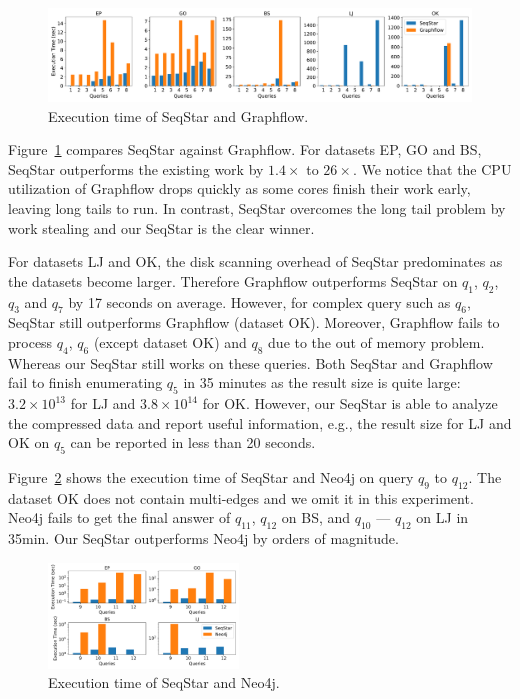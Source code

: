 \begin{figure}[ht]
  \centering
  \includegraphics[width=\textwidth]{img/exp_compare.pdf}
  \caption{Execution time of SeqStar and Graphflow.}\label{img:exp_compare}
\end{figure}

Figure~\ref{img:exp_compare} compares SeqStar against Graphflow.
For datasets EP, GO and BS, SeqStar outperforms the existing work by $1.4\times$ to $26\times$.
We notice that the CPU utilization of Graphflow drops quickly as some cores finish their work early,
leaving long tails to run.
In contrast, SeqStar overcomes the long tail problem by work stealing and our SeqStar is the clear winner.

For datasets LJ and OK, the disk scanning overhead of SeqStar predominates as the datasets become larger.
Therefore Graphflow outperforms SeqStar on $q_1$, $q_2$, $q_3$ and $q_7$ by 17 seconds on average.
However, for complex query such as $q_6$, SeqStar still outperforms Graphflow (dataset OK).
Moreover, Graphflow fails to process $q_4$, $q_6$ (except dataset OK) and $q_8$ due to the out of memory problem.
Whereas our SeqStar still works on these queries.
Both SeqStar and Graphflow fail to finish enumerating $q_5$ in 35 minutes as the result size is quite large:
$3.2 \times 10^{13}$ for LJ and $3.8 \times 10^{14}$ for OK\@.
However, our SeqStar is able to analyze the compressed data and report useful information,
e.g., the result size for LJ and OK on $q_5$ can be reported in less than 20 seconds.

Figure~\ref{img:exp_compare_neo4j} shows the execution time of SeqStar and Neo4j on query $q_9$ to $q_{12}$.
The dataset OK does not contain multi-edges and we omit it in this experiment.
Neo4j fails to get the final answer of $q_{11}$, $q_{12}$ on BS, and $q_{10}$ --- $q_{12}$ on LJ in 35min.
Our SeqStar outperforms Neo4j by orders of magnitude.
\begin{figure}[ht]
  \centering
  \includegraphics[width=0.45\textwidth]{img/exp_compare_neo4j.pdf}
  \caption{Execution time of SeqStar and Neo4j.}\label{img:exp_compare_neo4j}
\end{figure}
